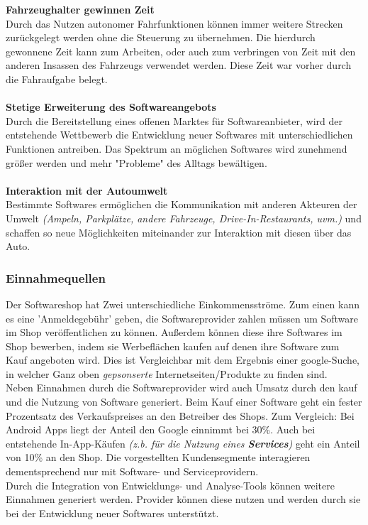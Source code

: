 \textbf{Fahrzeughalter gewinnen Zeit}\\
Durch das Nutzen autonomer Fahrfunktionen können immer weitere Strecken zurückgelegt werden ohne die Steuerung zu übernehmen. Die hierdurch gewonnene Zeit kann zum Arbeiten, oder auch zum verbringen von Zeit mit den anderen Insassen des Fahrzeugs verwendet werden. Diese Zeit war vorher durch die Fahraufgabe belegt.\\\\
\textbf{Stetige Erweiterung des Softwareangebots}\\
Durch die Bereitstellung eines offenen Marktes für Softwareanbieter, wird der entstehende Wettbewerb die Entwicklung neuer Softwares mit unterschiedlichen Funktionen antreiben. Das Spektrum an möglichen Softwares wird zunehmend größer werden und mehr "Probleme" des Alltags bewältigen.\\\\
\textbf{Interaktion mit der Autoumwelt}\\
Bestimmte Softwares ermöglichen die Kommunikation mit anderen Akteuren der Umwelt \textit{(Ampeln, Parkplätze, andere Fahrzeuge, Drive-In-Restaurants, uvm.)} und schaffen so neue Möglichkeiten miteinander zur Interaktion mit diesen über das Auto.

\subsubsection{Einnahmequellen}
Der Softwareshop hat Zwei unterschiedliche Einkommensströme. Zum einen kann es eine 'Anmeldegebühr' geben, die Softwareprovider zahlen müssen um Software im Shop veröffentlichen zu können. Außerdem können diese ihre Softwares im Shop bewerben, indem sie Werbeflächen kaufen auf denen ihre Software zum Kauf angeboten wird. Dies ist Vergleichbar mit dem Ergebnis einer google-Suche, in welcher Ganz oben \textit{gepsonserte} Internetseiten/Produkte zu finden sind.\\
Neben Einnahmen durch die Softwareprovider wird auch Umsatz durch den kauf und die Nutzung von Software generiert. Beim Kauf einer Software geht ein fester Prozentsatz des Verkaufspreises an den Betreiber des Shops. Zum Vergleich: Bei Android Apps liegt der Anteil den Google einnimmt bei 30\%. Auch bei entstehende In-App-Käufen \textit{(z.b. für die Nutzung eines \textbf{Services})} geht ein Anteil von 10\% an den Shop. Die vorgestellten Kundensegmente interagieren dementsprechend nur mit Software- und Serviceprovidern.\\
Durch die Integration von Entwicklungs- und Analyse-Tools können weitere Einnahmen generiert werden. Provider können diese nutzen und werden durch sie bei der Entwicklung neuer Softwares unterstützt.

